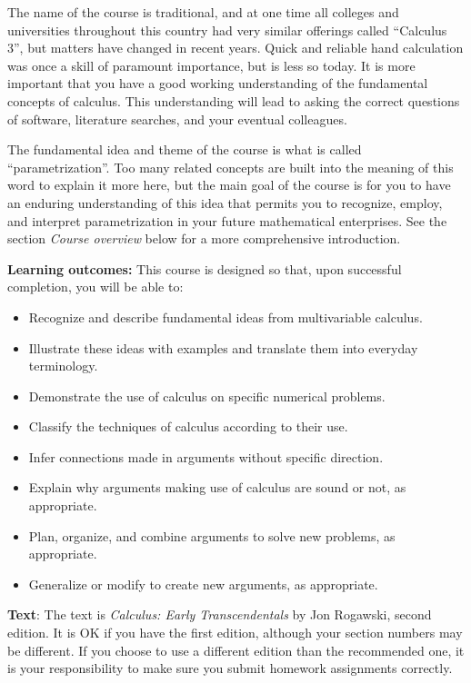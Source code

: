 \documentclass[12pt,twoside]{amsart}
\begin{document}
The name of the course is traditional, and at one time all colleges and universities throughout this country had very similar offerings called ``Calculus 3'', but matters have changed in recent years. Quick and reliable hand calculation was once a skill of paramount importance, but is less so today. It is more important that you have a good working understanding of the fundamental concepts of calculus. This understanding will lead to asking the correct questions of software, literature searches, and your eventual colleagues.

The fundamental idea and theme of the course is what is called ``parametrization''. Too many related concepts are built into the meaning of this word to explain it more here, but the main goal of the course is for you to have an enduring understanding of this idea that permits you to recognize, employ, and interpret parametrization in your future mathematical enterprises. See the section \emph{Course overview} below for a more comprehensive introduction.

\textbf{Learning outcomes:} This course is designed so that, upon successful completion, you will be able to:
\begin{itemize}
    \item Recognize and describe fundamental ideas from multivariable calculus.
    \item Illustrate these ideas with examples and translate them into everyday terminology.
    \item Demonstrate the use of calculus on specific numerical problems.
    \item Classify the techniques of calculus according to their use.
    \item Infer connections made in arguments without specific direction.
    \item Explain why arguments making use of calculus are sound or not, as appropriate.
    \item Plan, organize, and combine arguments to solve new problems, as appropriate.
    \item Generalize or modify to create new arguments, as appropriate.
\end{itemize}

\textbf{Text}: The text is \emph{Calculus: Early Transcendentals} by Jon Rogawski, second edition. It is OK if you have the first edition, although your section numbers may be different. If you choose to use a different edition than the recommended one, it is your responsibility to make sure you submit homework assignments correctly. 
\end{document}
